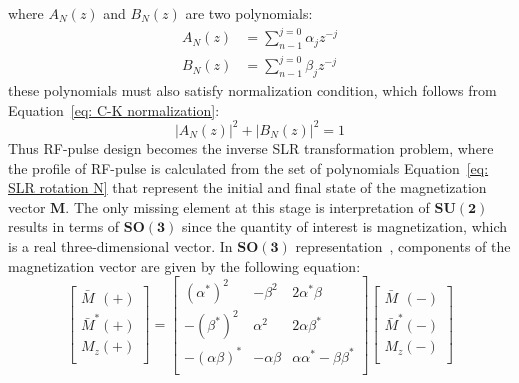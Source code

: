 where $A_N(z)$ and $B_N(z)$ are two polynomials:
\begin{equation}\label{eq: SLR rotation N}
\begin{aligned}
	A_N(z) & = \sum\limits_{n-1}^{j=0}\alpha_{j}z^{-j}\\[1mm]
	B_N(z) & = \sum\limits_{n-1}^{j=0}\beta_{j}z^{-j}
\end{aligned}
\end{equation}
these polynomials must also satisfy normalization condition, which follows from Equation~\ref{eq: C-K normalization}:
\begin{equation}\label{eq: C-K normalization polynom}
|A_N(z)|^2 + |B_N(z)|^2 = 1
\end{equation}
Thus RF-pulse design becomes the inverse SLR transformation problem, where the profile of RF-pulse is calculated from the set of polynomials Equation~\ref{eq: SLR rotation N} that represent the initial and final state of the magnetization vector $\mathbf{M}$. 
The only missing element at this stage is interpretation of $\mathbf{SU(2)}$ results in terms of $\mathbf{SO(3)}$ since the quantity of interest is magnetization, which is a real three-dimensional vector. 
In $\mathbf{SO(3)}$ representation~\cite{1955PhRevJaynes}, components of the magnetization vector are given by the following equation:
\begin{equation}\label{eq: PauliSO3_mag}
\begin{bmatrix}
    \bar{M}\phantom{^*}(+)\\
    \bar{M}^{*}(+)\\
    {M}_{z}(+)\\
\end{bmatrix} = 
	\begin{bmatrix}
    (\alpha^*)^2 & -\beta^2 & 2\alpha^*\beta\\
    -(\beta^*)^2 & \alpha^2 & 2\alpha\beta^*\\
    -(\alpha\beta)^* & -\alpha\beta & \alpha\alpha^*-\beta\beta^*\\
	\end{bmatrix}
	\begin{bmatrix}
    \bar{M}\phantom{^*}(-)\\
    \bar{M}^{*}(-)\\
    {M}_{z}(-)\\
    \end{bmatrix}
\end{equation}
